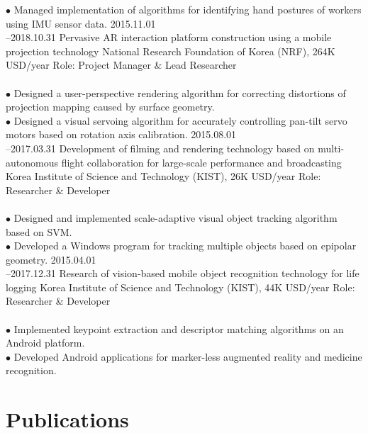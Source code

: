 \documentclass[]{friggeri-cv}
\begin{document}
\begin{entrylist}
{    $\bullet$ Managed implementation of algorithms for identifying hand postures of workers using IMU sensor data.
    }
  \entry
    {2015.11.01\\--2018.10.31} 
    {Pervasive AR interaction platform construction using a mobile projection technology}
    {National Research Foundation of Korea (NRF), 264K USD/year}
    {Role: Project Manager \& Lead Researcher\\
    \\
    $\bullet$ Designed a user-perspective rendering algorithm for correcting distortions of projection mapping caused by surface geometry.\\
    $\bullet$ Designed  a visual servoing algorithm for accurately controlling pan-tilt servo motors based on rotation axis calibration.
    }
  \entry
    {2015.08.01\\--2017.03.31}
    {Development of filming and rendering technology based on multi-autonomous flight collaboration for large-scale performance and broadcasting}
    {Korea Institute of Science and Technology (KIST), 26K USD/year}
    {Role: Researcher \& Developer\\
    \\
    $\bullet$ Designed and implemented scale-adaptive visual object tracking algorithm based on SVM.\\
    $\bullet$ Developed a Windows program for tracking multiple objects based on epipolar geometry.
    }
  \entry
    {2015.04.01\\--2017.12.31}
    {Research of vision-based mobile object recognition technology for life logging}
    {Korea Institute of Science and Technology (KIST), 44K USD/year}
    {Role: Researcher \& Developer\\
    \\
    $\bullet$ Implemented keypoint extraction and descriptor matching algorithms on an Android platform.\\
    $\bullet$ Developed Android applications for marker-less augmented reality and medicine recognition.
    }
\end{entrylist}

\section{Publications}

\begin{refsection}
  \nocite{*}
  \printbibliography[
    type=article, 
    title=\textbf{Publications of peer-reviewed journal articles}, 
    heading=subbibliography
  ]
\end{refsection}
\end{document}
